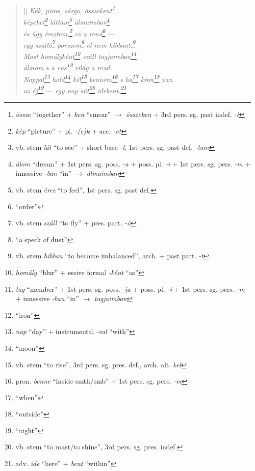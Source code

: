 \documentclass[a4paper,12pt,twoside,final]{book}
\begin{document}

\newpage

\settowidth{\versewidth}{Nappal hold kél bennem s ha kinn van}

\begin{verse}[\versewidth]
  \it
  Kék, piros, sárga, összekent\footnote{\emph{össze} ``together'' +
  \emph{ken} ``smear'' $\rightarrow$ \emph{összeken} + 3rd
  pers. sg. past indef. \emph{-t}} \\
  képeket\footnote{\emph{kép} ``picture'' + pl. \emph{-(e)k} +
  acc. \emph{-et}} láttam\footnote{vb. stem \emph{lát} ``to see'' +
  short base \emph{-t}, 1st pers. sg. past def. \emph{-tam}}
  álmaimban\footnote{\emph{álom} ``dream'' +
  1st pers. sg. poss. \emph{-a} + poss. pl. \emph{-i} + 1st
  pers. sg. pers. \emph{-m} + innessive \emph{-ban} ``in'' $\rightarrow$
  \emph{álmaimban}} \\
  és úgy éreztem,\footnote{vb. stem \emph{érez} ``to feel'', 1st
  pers. sg. past def.} ez a rend\footnote{``order''} --- \\
  egy szalló\footnote{vb. stem \emph{száll} ``to fly'' +
  pres. part. \emph{-ó}} porszem\footnote{``a speck of dust''} el nem
  hibbant.\footnote{vb. stem \emph{hibban}
  ``to become imbalanced'', arch. + past part. \emph{-t}} \\
  Most homályként\footnote{\emph{homály} ``blur'' +
  essive formal \emph{-ként} ``as''} száll tagjaimban\footnote{\emph{tag}
  ``member'' + 1st pers. sg. poss. \emph{-ja} +
  poss. pl. \emph{-i} + 1st pers. sg. pers. \emph{-m} +
  innessive \emph{-ban} ``in'' $\rightarrow$ \emph{tagjaimban}} \\
  álmom s a vas\footnote{``iron''} világ a rend. \\
  Nappal\footnote{\emph{nap} ``day'' + instrumental \emph{-val}
  ``with''} hold\footnote{``moon''} kél\footnote{vb. stem ``to rise'',
  3rd pers. sg. pres. def., arch. alt. \emph{kel}}
  bennem\footnote{pron. \emph{benne} ``inside smth/smb'' + 1st
  pers. sg. pers. \emph{-m}} s ha\footnote{``when''}
  kinn\footnote{``outside''} van  \\
  az éj\footnote{``night''} --- egy nap süt\footnote{vb. stem ``to
  roast/to shine'', 3rd pers. sg. pres. indef.}
  idebent.\footnote{adv. \emph{ide} ``here'' + \emph{bent} ``within''}
\end{verse}
\end{document}
